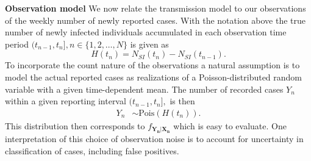 \newline
\textbf{Observation model}
We now relate the transmission model to our observations of the weekly number of newly reported cases.  With the notation above
 the true number of newly infected individuals accumulated  in each observation time period $(t_{n-1},t_{n}], n \in \{1,2,\dots,N\}$  is given as 
\begin{equation}
H(t_n)=N_{SI}(t_{n})-N_{SI}(t_{n-1}).\label{obs_stoc}
\end{equation}
To incorporate the  count nature of the observations a natural assumption is  to model the actual reported cases as  realizations of a Poisson-distributed random variable with a given time-dependent mean. 
\noindent The number of recorded  cases $Y_n$ within a given reporting interval $(t_{n-1},t_{n}],$ is then 
\begin{align}
Y_n &\sim \text{Pois}\left(  H(t_n)\right).
\label{poisson}
\end{align}
This distribution then corresponds to $f_{\bm{Y_n|\bm{X}_n}}$ which is easy to evaluate. One interpretation of this choice of observation noise is to account for uncertainty in classification of cases, including false positives. 

